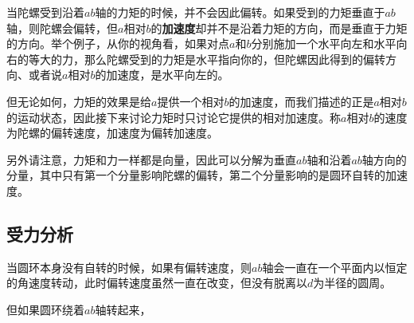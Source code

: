 当陀螺受到沿着$ab$轴的力矩的时候，并不会因此偏转。如果受到的力矩垂直于$ab$轴，则陀螺会偏转，但$a$相对$b$的\textbf{加速度}却并不是沿着力矩的方向，而是垂直于力矩的方向。举个例子，从你的视角看，如果对点$a$和$b$分别施加一个水平向左和水平向右的等大的力，那么陀螺受到的力矩是水平指向你的，但陀螺因此得到的偏转方向、或者说$a$相对$b$的加速度，是水平向左的。



但无论如何，力矩的效果是给$a$提供一个相对$b$的加速度，而我们描述的正是$a$相对$b$的运动状态，因此接下来讨论力矩时只讨论它提供的相对加速度。称$a$相对$b$的速度为陀螺的偏转速度，加速度为偏转加速度。

另外请注意，力矩和力一样都是向量，因此可以分解为垂直$ab$轴和沿着$ab$轴方向的分量，其中只有第一个分量影响陀螺的偏转，第二个分量影响的是圆环自转的加速度。




\subsection{受力分析}



当圆环本身没有自转的时候，如果有偏转速度，则$ab$轴会一直在一个平面内以恒定的角速度转动，此时偏转速度虽然一直在改变，但没有脱离以$d$为半径的圆周。

但如果圆环绕着$ab$轴转起来，




























